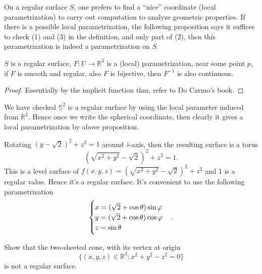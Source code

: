 On a regular surface \(S\), one prefers to find a ``nice'' coordinate
(local parametrization) to carry out computation to analyze geometric properties.
If there is a possible local parametrization, the following proposition says it
suffices to check (1) and (3) in the definition, and only part of (2), then this
parametrization is indeed a parametrization on \(S\).
\begin{prop}
    \(S\) is a regular surface, \(F\colon U\to \mathbb{R}^3\) is a (local)
    parametrization, near some point \(p\), if \(F\) is smooth and regular, also
    \(F\) is bijective, then \(F^{-1}\) is also continuous.
\end{prop}
\begin{proof}
    Essentially by the implicit function thm, refer to Do Carmo's book.
\end{proof}

\begin{example}
    We have checked \(\mathbb{S}^2\) is a regular surface by using the local
    parameter induced from \(\mathbb{R}^3\). Hence once we write the spherical
    coordinate, then clearly it gives a local parametrization by above proposition.
\end{example}

\begin{example}[Torus]
    Rotating \((y-\sqrt{2})^2+z^2=1\) around \(z\)-axis, then the resulting surface
    is a torus \[
        (\sqrt{x^2+y^2}-\sqrt{2})^2+z^2=1
    .\] This is a level surface of \(f(x,y,z)=(\sqrt{x^2+y^2}-\sqrt{2})^2+z^2\) and
    1 is a regular value. Hence it's a regular surface. It's convenient to use
    the following parametrization \[
        \begin{cases}
            x=(\sqrt{2}+\cos\theta)\sin\varphi \\
            y=(\sqrt{2}+\cos\theta)\cos\varphi \\
            z=\sin\theta
        \end{cases}
    .\] 
\end{example}

\begin{exercise}[Homework]
    Show that the two-sheeted cone, with its vertex at origin \[
        \{(x,y,z)\in \mathbb{R}^3:x^2+y^2-z^2=0\}
    \] is not a regular surface.
\end{exercise}

